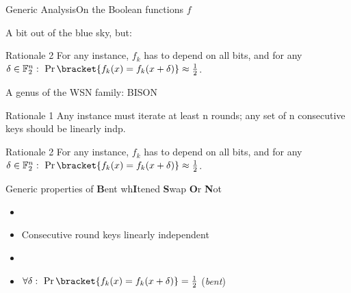 \begin{frame}{Generic Analysis}{On the Boolean functions $f$}
    \centering

    A bit out of the blue sky, but:

    \begin{exampleblock}{Rationale 2}
        For any instance, $f_{k}$ has to depend on all bits, and for any $\delta \in \F_2^n:\ \Pr\bracket{f_k(x) = f_k(x + \delta)} \approx \frac{1}{2}$.
    \end{exampleblock}
\end{frame}

\begin{frame}{A genus of the WSN family: BISON}
    \centering
    \begin{exampleblock}{Rationale 1}
        Any instance must iterate at least n rounds; any set of n consecutive keys should be linearly indp.
    \end{exampleblock}
    \begin{exampleblock}{Rationale 2}
        For any instance, $f_{k}$ has to depend on all bits, and for any $\delta \in \F_2^n:\ \Pr\bracket{f_k(x) = f_k(x + \delta)} \approx \frac{1}{2}$.
    \end{exampleblock}
    \begin{block}{Generic properties of {\textbf{B}ent wh\textbf{I}tened \textbf{S}wap \textbf{O}r \textbf{N}ot}}
        \vspace{5pt}
        \begin{minipage}{0.51\textwidth}
        \begin{itemize}
            \item {}
            \item Consecutive round keys linearly independent
        \end{itemize}
        \end{minipage}
        \begin{minipage}{0.44\textwidth}
        \begin{itemize}
            \item {}
            \item $\forall \delta :\ \Pr\bracket{f_k(x) = f_k(x + \delta)} = \frac{1}{2}$ (\emph{bent})
        \end{itemize}

\end{minipage}
\end{block}
\end{frame}
